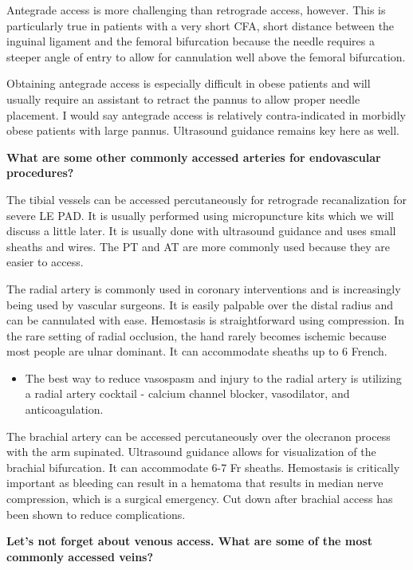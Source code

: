 \documentclass[
]{book}
\providecommand{\tightlist}{%
  \setlength{\itemsep}{0pt}\setlength{\parskip}{0pt}}
\begin{document}
Antegrade access is more challenging than retrograde access, however.
This is particularly true in patients with a very short CFA, short
distance between the inguinal ligament and the femoral bifurcation
because the needle requires a steeper angle of entry to allow for
cannulation well above the femoral bifurcation.

Obtaining antegrade access is especially difficult in obese patients and
will usually require an assistant to retract the pannus to allow proper
needle placement. I would say antegrade access is relatively
contra-indicated in morbidly obese patients with large pannus.
Ultrasound guidance remains key here as well.

\textbf{What are some other commonly accessed arteries for endovascular
procedures?}

The tibial vessels can be accessed percutaneously for retrograde
recanalization for severe LE PAD. It is usually performed using
micropuncture kits which we will discuss a little later. It is usually
done with ultrasound guidance and uses small sheaths and wires. The PT
and AT are more commonly used because they are easier to access.

The radial artery is commonly used in coronary interventions and is
increasingly being used by vascular surgeons. It is easily palpable over
the distal radius and can be cannulated with ease. Hemostasis is
straightforward using compression. In the rare setting of radial
occlusion, the hand rarely becomes ischemic because most people are
ulnar dominant. It can accommodate sheaths up to 6 French.

\begin{itemize}
\tightlist
\item
  The best way to reduce vasospasm and injury to the radial artery is
  utilizing a radial artery cocktail - calcium channel blocker,
  vasodilator, and anticoagulation.\citep{mason2018, cauley2019}
\end{itemize}

The brachial artery can be accessed percutaneously over the olecranon
process with the arm supinated.\citep{alvarez-tostado2009} Ultrasound
guidance allows for visualization of the brachial bifurcation. It can
accommodate 6-7 Fr sheaths. Hemostasis is critically important as
bleeding can result in a hematoma that results in median nerve
compression, which is a surgical emergency. Cut down after brachial
access has been shown to reduce complications.\citep{kret2016}

\textbf{Let's not forget about venous access. What are some of the most
commonly accessed veins?}
\end{document}
